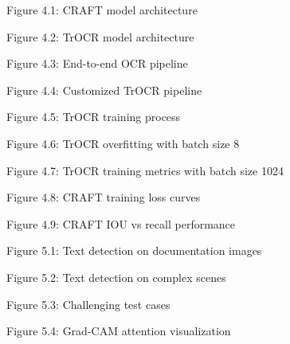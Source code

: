 \begin{adjustwidth}{0.2cm}{0.2cm}
    {\large Figure 4.1: CRAFT model architecture\dotfill\pageref{fig:craft-model}\hspace{0.1cm}\par}
    
    {\large Figure 4.2: TrOCR model architecture\dotfill\pageref{fig:trocr-model}\hspace{0.1cm}\par}
    
    {\large Figure 4.3: End-to-end OCR pipeline\dotfill\pageref{fig:trocr-inference-full-pipeline}\hspace{0.1cm}\par}
    
    {\large Figure 4.4: Customized TrOCR pipeline\dotfill\pageref{fig:trocr-custom-processor}\hspace{0.1cm}\par}
    
    {\large Figure 4.5: TrOCR training process\dotfill\pageref{fig:trocr-training-pipeline}\hspace{0.1cm}\par}
    
    {\large Figure 4.6: TrOCR overfitting with batch size 8\dotfill\pageref{fig:trocr-overfitting}\hspace{0.1cm}\par}
    
    {\large Figure 4.7: TrOCR training metrics with batch size 1024\dotfill\pageref{fig:trocr-fine-tuning}\hspace{0.1cm}\par}
    
    {\large Figure 4.8: CRAFT training loss curves\dotfill\pageref{fig:mean-loss-craft}\hspace{0.1cm}\par}
    
    {\large Figure 4.9: CRAFT IOU vs recall performance\dotfill\pageref{fig:iou-recall-craft}\hspace{0.1cm}\par}
    
    {\large Figure 5.1: Text detection on documentation images\dotfill\pageref{fig:detection-craft}\hspace{0.1cm}\par}
    
    {\large Figure 5.2: Text detection on complex scenes\dotfill\pageref{fig:detection-craft-post}\hspace{0.1cm}\par}
    
    {\large Figure 5.3: Challenging test cases\dotfill\pageref{fig:test-case}\hspace{0.1cm}\par}
    
    {\large Figure 5.4: Grad-CAM attention visualization\dotfill\pageref{fig:grad_cam}\hspace{0.1cm}\par}

\end{adjustwidth}